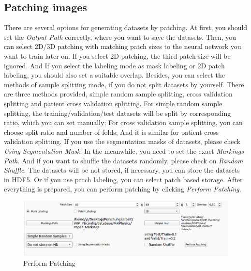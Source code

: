 \documentclass[12pt]{article}
\begin{document}
\subsection{Patching images}
There are several options for generating datasets by patching. At first, you should set the \textit{Output Path} correctly, where you want to save the datasets. Then, you can select 2D/3D patching with matching patch sizes to the neural network you want to train later on. If you select 2D patching, the third patch size will be ignored. And If you select the labeling mode as mask labeling or 2D patch labeling, you should also set a suitable overlap. Besides, you can select the methods of sample splitting mode, if you do not split datasets by yourself. There are three methods provided, simple random sample splitting, cross validation splitting and patient cross validation splitting. For simple random sample splitting, the training/validation/test datasets will be split by corresponding ratio, which you can set manually; For cross validation sample splitting, you can choose split ratio and number of folds; And it is similar for patient cross validation splitting. If you use the segmentation masks of datasets, please check \textit{Using Segmentation Mask}. In the meanwhile, you need to set the exact \textit{Markings Path}. And if you want to shuffle the datasets randomly, please check on \textit{Random Shuffle}. The datasets will be not stored, if necessary, you can store the datasets in HDF5. Or if you use patch labeling, you can select patch based storage. After everything is prepared, you can perform patching by clicking \textit{Perform Patching}.
\begin{figure}[htbp]	
	\centering
	\includegraphics[width=\textwidth]{perform_patching.png}
	\caption[Perform Patching]{Perform Patching}
	\label{fig:perform_patching}
\end{figure}
\end{document}
